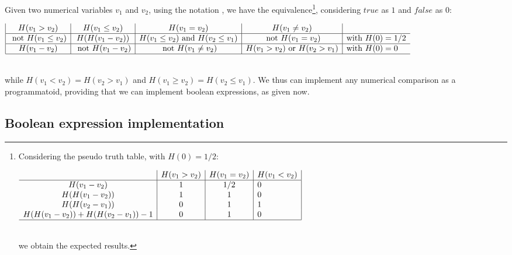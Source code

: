 \documentclass[a4]{article}
\newcommand{\eqline}[1]{~\vspace{0.1cm}\\\centerline{$#1$}\vspace{0.1cm}\\}
\begin{document}
Given two numerical variables $v_1$ and $v_2$, using the notation ,
we have the equivalence\footnote{
Considering the pseudo truth table, with $H(0) = 1/2$:
\eqline{\begin{array}{c|c|c|l|}
                                                             &H(v_1 > v_2) &H(v_1 = v_2) & H(v_1 < v_2) \\\hline
    H(v_1 - v_2)                                      & 1                  &   1/2           & 0 \\
    H(H(v_1 - v_2))                                 & 1                 &   1              & 0 \\
    H(H(v_2 - v_1))                                 & 0                 &   1              & 1 \\
    H(H(v_1 - v_2)) +H(H(v_2 - v_1))-1   & 0                 &   1              & 0 \\ \hline
\end{array}}  we obtain the expected results.}, considering $true$ as $1$ and $false$ as $0$:
\eqline{\begin{array}{|c|c|c|c|l}
    H(v_1 > v_2)                            & H(v_1 \le v_2)                        & H(v_1 = v_2)                                                    & H(v_1 \ne v_2)         \\  \hline
    \mbox{ not } H(v_1 \le v_2)   & H(H(v_1 - v_2))                      & H(v_1 \le v_2)  \mbox{ and } H(v_2 \le v_1)   & \mbox{ not } H(v_1 = v_2)                  & \mbox{with } H(0) = 1/2\\ \hline
    H(v_1 - v_2)                            & \mbox{ not } H(v_1 - v_2)     & \mbox{ not } H(v_1 \ne v_2)                          &H(v_1 > v_2) \mbox{ or } H(v_2> v_1)  & \mbox{with } H(0) = 0\\
\hline\end{array}}
while $H(v_1 < v_2) = H(v_2 > v_1)$ and $H(v_1 \ge v_2) = H(v_2 \le v_1)$. We thus can implement any numerical comparison as a programmatoid, providing that we can implement boolean expressions, as given now.

\subsection{Boolean expression implementation}
\end{document}
